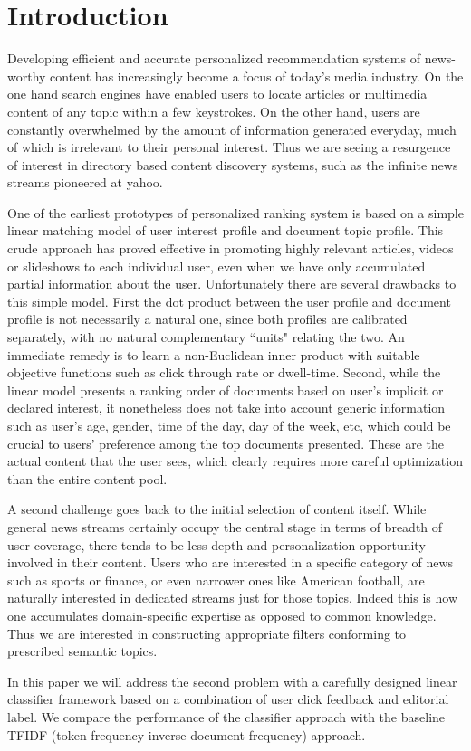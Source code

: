 \section{Introduction}



Developing efficient and accurate personalized recommendation systems of 
news-worthy content has increasingly become a focus of today's media industry. 
On the one hand search engines have enabled users to locate articles or 
multimedia content of any topic within a few keystrokes. On the other hand, 
users are constantly overwhelmed by the amount of information generated 
everyday, much of which is irrelevant to their personal interest. Thus we are 
seeing a resurgence of interest in directory based content discovery systems, 
such as the infinite news streams pioneered at yahoo. 

One of the earliest prototypes of personalized ranking system is based on a 
simple linear matching model of user interest profile and document topic 
profile. This crude approach has proved effective in promoting highly relevant 
articles, videos or slideshows to each individual user, even when we have only 
accumulated partial information about the user. Unfortunately there are 
several drawbacks to this simple model. First the dot product between the user 
profile and document profile is not necessarily a natural one, since both 
profiles are calibrated separately, with no natural complementary ``units" 
relating the two. An immediate remedy is to learn a non-Euclidean inner 
product with suitable objective functions such as click through rate or 
dwell-time. Second, while the linear model presents a ranking order of 
documents based on user's implicit or declared interest, it nonetheless does 
not take into account generic information such as user's age, gender, time of 
the day, day of the week, etc, which could be crucial to users' preference 
among the top documents presented. These are the actual content that the user 
sees, which clearly requires more careful optimization than the entire content 
pool. 

A second challenge goes back to the initial selection of content itself. While 
general news streams certainly occupy the central stage in terms of breadth of 
user coverage, there tends to be less depth and personalization opportunity 
involved in their content. Users who are interested in a specific category of 
news such as sports or finance, or even narrower ones like American football, 
are naturally interested in dedicated streams just for those topics. Indeed 
this is how one accumulates domain-specific expertise as opposed to common 
knowledge. Thus we are interested in constructing appropriate filters 
conforming to prescribed semantic topics. 

In this paper we will address the second problem with a carefully designed 
linear classifier framework based on a combination of user click feedback and 
editorial label. We compare the performance of the classifier approach with 
the baseline TFIDF (token-frequency inverse-document-frequency) approach. 
